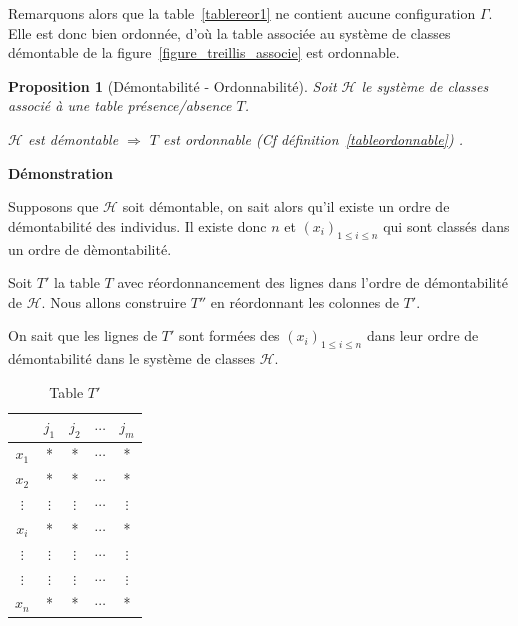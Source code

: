\documentclass[a4paper]{report}
\renewcommand{\textbf}[1]{\begingroup\bfseries\mathversion{bold}#1\endgroup}
\newtheorem{proposition}{Proposition}[chapter]
\newenvironment{preuve}{\textbf{Démonstration}}{}
\begin{document}
Remarquons alors que la table~\ref{tablereor1} ne contient aucune configuration $\Gamma$. Elle est donc bien ordonnée, d'où 
la table associée au système de classes démontable de la figure~\ref{figure_treillis_associe} est ordonnable.

\begin{proposition}[Démontabilité - Ordonnabilité]

\label{tabletreillis2}
Soit $\mathcal{H}$ le système de classes associé à une table présence/absence $T$.

$\mathcal{H}$ est démontable $\Rightarrow$ $T$ est ordonnable (Cf définition~\ref{tableordonnable}) .  

\end{proposition}

\begin{preuve}

Supposons que $\mathcal{H}$ soit démontable, on sait alors qu'il existe un ordre de démontabilité des individus.
Il existe donc $n$ et $(x_i)_{1 \leqslant i \leqslant n}$ 
qui sont classés dans  un ordre de dèmontabilité.

Soit $T'$ la table $T$ avec réordonnancement des lignes dans l'ordre de démonta\-bilité de $\mathcal{H}$. 
Nous allons construire $T''$ en réordonnant les colonnes de $T'$.

On sait que les lignes de $T'$ sont formées des $(x_i)_{1 \leqslant i \leqslant n}$ dans leur ordre de 
démontabilité dans le système de classes $\mathcal{H}$.

\begin{table}[htb]
\centering
\begin{tabular}{ |c | c | c |c | c |}
\hline
 & $j_1$ & $j_2$ & $\cdots$ & $j_m$\\
\hline
$x_1$ & * & * & $\cdots$ & *\\
\hline
$x_2$ & * & * & $\cdots$ & *\\
\hline
$\vdots$ & $\vdots$ & $\vdots$ & $\cdots$ & $\vdots$\\
\hline
$x_i$ & * & * & $\cdots$ & *\\
\hline
$\vdots$ & $\vdots$ & $\vdots$ & $\cdots$ & $\vdots$\\
\hline
$\vdots$ & $\vdots$ & $\vdots$ & $\cdots$ & $\vdots$\\
\hline
$x_n$ & * & * & $\cdots$ & *\\
\hline
\end{tabular}
\caption{Table $T'$}
\end{table}



\end{preuve}
\end{document}
